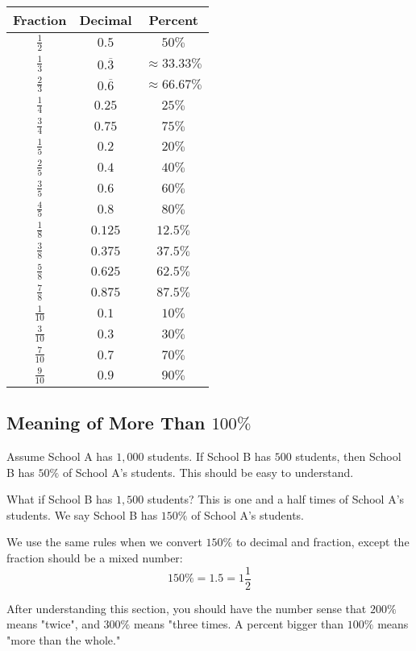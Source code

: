 \begin{center}
\begin{tabular}{ | c | c | c | }
	\hline
    \textbf{Fraction} & \textbf{Decimal} & \textbf{Percent} \\ \hline
  $\frac{1}{2}$ & $0.5$ & $50\%$ \\ \hline
  $\frac{1}{3}$ & $0.\overline{3}$ & $\approx33.33\%$ \\ \hline
  $\frac{2}{3}$ & $0.\overline{6}$ & $\approx66.67\%$ \\ \hline
  $\frac{1}{4}$ & $0.25$ & $25\%$ \\ \hline
  $\frac{3}{4}$ & $0.75$ & $75\%$ \\ \hline
  $\frac{1}{5}$ & $0.2$ & $20\%$ \\ \hline
  $\frac{2}{5}$ & $0.4$ & $40\%$ \\ \hline
  $\frac{3}{5}$ & $0.6$ & $60\%$ \\ \hline
  $\frac{4}{5}$ & $0.8$ & $80\%$ \\ \hline
  $\frac{1}{8}$ & $0.125$ & $12.5\%$ \\ \hline
  $\frac{3}{8}$ & $0.375$ & $37.5\%$ \\ \hline
  $\frac{5}{8}$ & $0.625$ & $62.5\%$ \\ \hline
  $\frac{7}{8}$ & $0.875$ & $87.5\%$ \\ \hline
  $\frac{1}{10}$ & $0.1$ & $10\%$ \\ \hline
  $\frac{3}{10}$ & $0.3$ & $30\%$ \\ \hline
  $\frac{7}{10}$ & $0.7$ & $70\%$ \\ \hline
  $\frac{9}{10}$ & $0.9$ & $90\%$ \\ \hline
\end{tabular}
\end{center}

\subsection{Meaning of More Than $100\%$}
Assume School A has $1,000$ students. If School B has $500$ students, then School B has $50\%$ of School A's students. This should be easy to understand.

What if School B has $1,500$ students? This is one and a half times of School A's students. We say School B has $150\%$ of School A's students.

We use the same rules when we convert $150\%$ to decimal and fraction, except the fraction should be a mixed number:
\[ 150\% = 1.5 = 1 \frac{1}{2} \]

After understanding this section, you should have the number sense that $200\%$ means "twice", and $300\%$ means "three times. A percent bigger than $100\%$ means "more than the whole."

